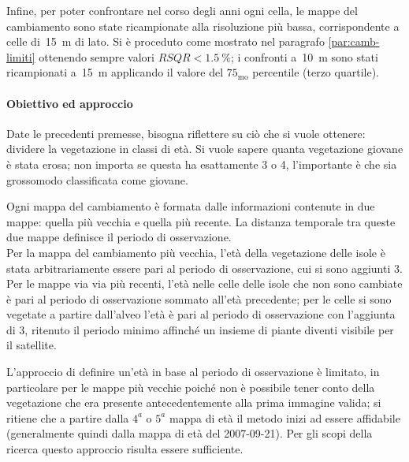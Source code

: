 Infine, per poter confrontare nel corso degli anni ogni cella, le mappe del cambiamento sono state ricampionate alla risoluzione più bassa, corrispondente a celle di~\SI{15}{\m} di lato. Si è proceduto come mostrato nel paragrafo \ref{par:camb-limiti} ottenendo sempre valori $RSQR < \SI{1.5}{\percent}$; i confronti a~\SI{10}{\m} sono stati ricampionati a~\SI{15}{\m} applicando il valore del $75_\mathrm{mo}$ percentile (terzo quartile).
 


\paragraph{Obiettivo ed approccio} 
Date le precedenti premesse, bisogna riflettere su ciò che si vuole ottenere: dividere la vegetazione in classi di età.
Si vuole sapere quanta vegetazione giovane è stata erosa; non importa se questa ha esattamente \SI{3}{\anni} o \SI{4}{\anni}, l'importante è che sia grossomodo classificata come giovane.

Ogni mappa del cambiamento è formata dalle informazioni contenute in due mappe: quella più vecchia e quella più recente. La distanza temporale tra queste due mappe definisce il periodo di osservazione.
\\
Per la mappa del cambiamento più vecchia, l'età della vegetazione delle isole è stata arbitrariamente essere pari al periodo di osservazione, cui si sono aggiunti \SI{3}{\anni}.
\\
Per le mappe via via più recenti, l'età nelle celle delle isole che non sono cambiate è pari al periodo di osservazione sommato all'età precedente; per le celle si sono vegetate a partire dall'alveo l'età è pari al periodo di osservazione con l'aggiunta di \SI{3}{\anni}, ritenuto il periodo minimo affinché un insieme di piante diventi visibile per il satellite.

\medskip
L'approccio di definire un'età in base al periodo di osservazione è limitato, in particolare per le mappe più vecchie poiché non è possibile tener conto della vegetazione che era presente antecedentemente alla prima immagine valida;
si ritiene che a partire dalla $4^a$ o $5^a$ mappa di età il metodo inizi ad essere affidabile (generalmente quindi dalla mappa di età del 2007-09-21).
Per gli scopi della ricerca questo approccio risulta essere sufficiente.

